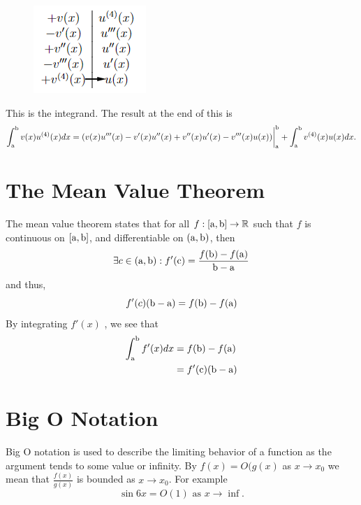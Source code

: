     \begin{figure}[H]
        \centering
        \includegraphics{include/tabular-integrand.png}
    \end{figure}
    This is the integrand. The result at the end of this is 
    \begin{equation}
        \int_\mathrm{a}^\mathrm{b} v(x)u^{(4)}(x) dx = (v(x)u'''(x) - v'(x)u''(x) + v''(x)u'(x)-v'''(x)u(x))\biggr\rvert_\mathrm{a}^\mathrm{b} + \int_\mathrm{a}^\mathrm{b} v^{(4)}(x)u(x) dx.
    \end{equation}
\section{The Mean Value Theorem}
    The mean value theorem states that for all \(f:[\mathrm{a},\mathrm{b}]\to \mathbb{R}\) such that \(f\) is continuous on \([\mathrm{a},\mathrm{b}]\), and differentiable on \((\mathrm{a}, \mathrm{b})\), then 
    \begin{equation}
        \exists c \in (\mathrm{a}, \mathrm{b}) : f'(\text{c}) = \frac{f(\mathrm{b})-f(\mathrm{a})}{\mathrm{b}-\mathrm{a}}
    \end{equation}
    and thus,
    \begin{equation}
        f'(c)(\mathrm{b}-\mathrm{a}) = f(\mathrm{b})-f(\mathrm{a})
    \end{equation}
    By integrating \(f'(x)\) , we see that
    \begin{equation}
        \begin{split}
            \int_{\mathrm{a}}^{\mathrm{b}} f'(x) dx &= f(\mathrm{b})-f(\mathrm{a})\\
            &=f'(\text{c})(\mathrm{b}-\mathrm{a})
        \end{split}
    \end{equation}
\section{Big O Notation}
Big O notation is used to describe the limiting behavior of a function as the argument tends to some value or infinity. By \(f(x)=O(g(x)\) as \(x\to x_0\) we mean that \(\frac{f(x)}{g(x)}\) is bounded as \(x\to x_0\). For example 
\begin{equation}
    \sin 6x = O(1) \text{ as } x\to \inf.
\end{equation}